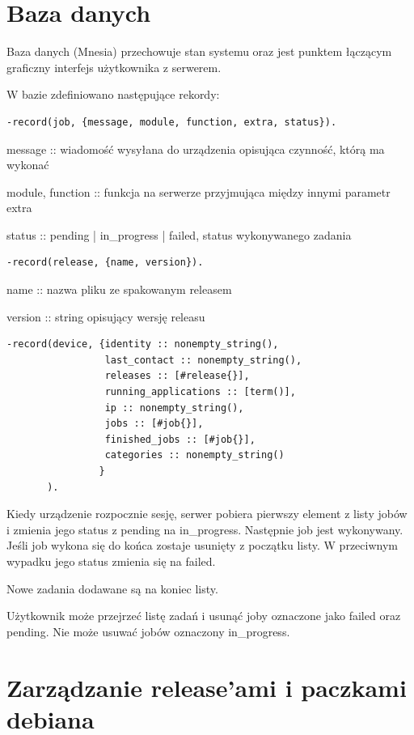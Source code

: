 \documentclass[polish,12pt]{aghthesis}
\begin{document}
\section{Baza danych}

Baza danych (Mnesia) przechowuje stan systemu oraz jest punktem łączącym graficzny interfejs użytkownika z serwerem.

W bazie zdefiniowano następujące rekordy:

\begin{verbatim}
-record(job, {message, module, function, extra, status}).
\end{verbatim}

message :: wiadomość wysyłana do urządzenia opisująca czynność, którą ma wykonać

module, function :: funkcja na serwerze przyjmująca między innymi parametr extra

status :: pending | in\_progress | failed, status wykonywanego zadania

\begin{verbatim}
-record(release, {name, version}).
\end{verbatim}

name :: nazwa pliku ze spakowanym releasem

version :: string opisujący wersję releasu

\begin{verbatim}
-record(device, {identity :: nonempty_string(),
                 last_contact :: nonempty_string(),
                 releases :: [#release{}],
                 running_applications :: [term()],
                 ip :: nonempty_string(),
                 jobs :: [#job{}],
                 finished_jobs :: [#job{}],
                 categories :: nonempty_string()
                }
       ).
\end{verbatim}

Kiedy urządzenie rozpocznie sesję, serwer pobiera pierwszy element z listy jobów i zmienia jego status z pending na in\_progress. Następnie job jest wykonywany. Jeśli job wykona się do końca zostaje usunięty z początku listy. W przeciwnym wypadku jego status zmienia się na failed.

Nowe zadania dodawane są na koniec listy.

Użytkownik może przejrzeć listę zadań i usunąć joby oznaczone jako failed oraz pending. Nie może usuwać jobów oznaczony in\_progress.

\section{Zarządzanie release'ami i paczkami debiana}
\end{document}

